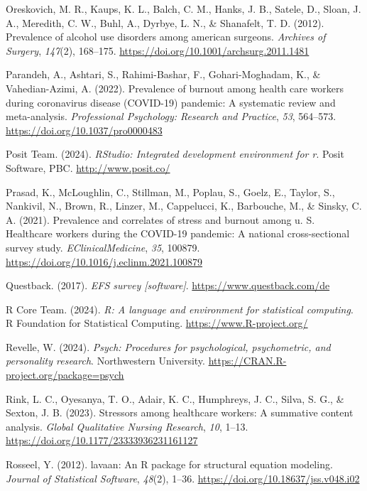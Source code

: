 \documentclass[
  man]{apa6}
\newlength{\cslhangindent}
\newenvironment{CSLReferences}[2] %
 {\begin{list}{}{%
  \setlength{\itemindent}{0pt}
  \setlength{\leftmargin}{0pt}
  \setlength{\parsep}{0pt}
  \ifodd #1
   \setlength{\leftmargin}{\cslhangindent}
   \setlength{\itemindent}{-1\cslhangindent}
  \fi
  \setlength{\itemsep}{#2\baselineskip}}}
 {\end{list}}
\begin{document}
\begin{CSLReferences}{1}{0}
Oreskovich, M. R., Kaups, K. L., Balch, C. M., Hanks, J. B., Satele, D., Sloan, J. A., Meredith, C. W., Buhl, A., Dyrbye, L. N., \& Shanafelt, T. D. (2012). Prevalence of alcohol use disorders among american surgeons. \emph{Archives of Surgery}, \emph{147}(2), 168--175. \url{https://doi.org/10.1001/archsurg.2011.1481}

Parandeh, A., Ashtari, S., Rahimi-Bashar, F., Gohari-Moghadam, K., \& Vahedian-Azimi, A. (2022). Prevalence of burnout among health care workers during coronavirus disease ({COVID-19}) pandemic: A systematic review and meta-analysis. \emph{Professional Psychology: Research and Practice}, \emph{53}, 564--573. \url{https://doi.org/10.1037/pro0000483}

Posit Team. (2024). \emph{RStudio: Integrated development environment for r}. Posit Software, PBC. \url{http://www.posit.co/}

Prasad, K., McLoughlin, C., Stillman, M., Poplau, S., Goelz, E., Taylor, S., Nankivil, N., Brown, R., Linzer, M., Cappelucci, K., Barbouche, M., \& Sinsky, C. A. (2021). Prevalence and correlates of stress and burnout among u. S. Healthcare workers during the COVID-19 pandemic: A national cross-sectional survey study. \emph{EClinicalMedicine}, \emph{35}, 100879. \url{https://doi.org/10.1016/j.eclinm.2021.100879}

Questback. (2017). \emph{EFS survey {[}software{]}}. \url{https://www.questback.com/de}

R Core Team. (2024). \emph{R: A language and environment for statistical computing}. R Foundation for Statistical Computing. \url{https://www.R-project.org/}

Revelle, W. (2024). \emph{Psych: Procedures for psychological, psychometric, and personality research}. Northwestern University. \url{https://CRAN.R-project.org/package=psych}

Rink, L. C., Oyesanya, T. O., Adair, K. C., Humphreys, J. C., Silva, S. G., \& Sexton, J. B. (2023). Stressors among healthcare workers: A summative content analysis. \emph{Global Qualitative Nursing Research}, \emph{10}, 1--13. \url{https://doi.org/10.1177/23333936231161127}

Rosseel, Y. (2012). {lavaan}: An {R} package for structural equation modeling. \emph{Journal of Statistical Software}, \emph{48}(2), 1--36. \url{https://doi.org/10.18637/jss.v048.i02}


\end{CSLReferences}
\end{document}
